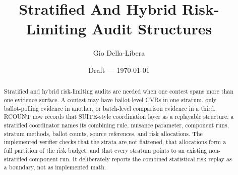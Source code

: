 \documentclass[12pt]{article}
\title{Stratified And Hybrid Risk-Limiting Audit Structures}
\author{Gio Della-Libera}
\date{Draft --- \today}
\begin{document}
\maketitle

\begin{abstract}
Stratified and hybrid risk-limiting audits are needed when one contest spans
more than one evidence surface. A contest may have ballot-level CVRs in one
stratum, only ballot-polling evidence in another, or batch-level comparison
evidence in a third. RCOUNT now records that SUITE-style coordination layer as
a replayable structure: a stratified coordinator names its combining rule,
nuisance parameter, component runs, stratum methods, ballot counts, source
references, and risk allocations. The implemented verifier checks that the
strata are not flattened, that allocations form a full partition of the risk
budget, and that every stratum points to an existing non-stratified component
run. It deliberately reports the combined statistical risk replay as a
boundary, not as implemented math.
\end{abstract}








\nocite{rcount-overview-2026,rcount-v7-2026}


\end{document}
